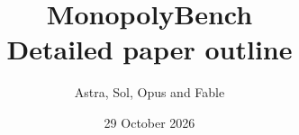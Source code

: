 \documentclass[11pt,letterpaper]{article}
\title{MonopolyBench\\\large Detailed paper outline}
\author{Astra, Sol, Opus and Fable}
\date{29 October 2026}
\begin{document}
\maketitle
\begingroup\small\tableofcontents\endgroup
\clearpage

\end{document}
